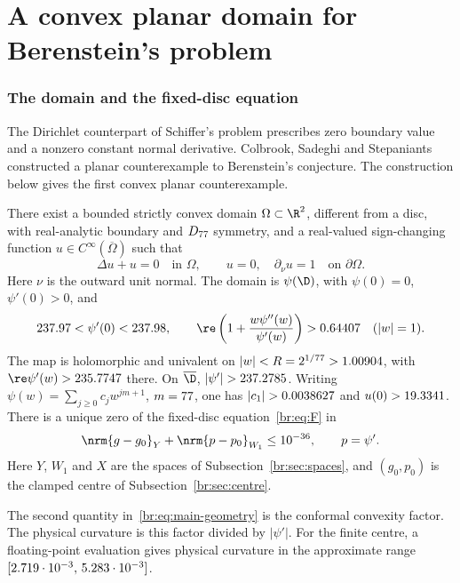 \part{A convex planar domain for Berenstein's problem}\label{br:part}
\section{The domain and the fixed-disc equation}\label{br:sec:formulation}

The Dirichlet counterpart of Schiffer's problem prescribes zero boundary
value and a nonzero constant normal derivative. Colbrook, Sadeghi and
Stepaniants~\cite{CSS26} constructed a planar counterexample to
Berenstein's conjecture. The construction below gives the first convex
planar counterexample.

\begin{theorem}\label{br:thm:main}
There exist a bounded strictly convex domain $\Omega\subset\R^2$, different
from a disc, with real-analytic boundary and $D_{77}$ symmetry, and a
real-valued sign-changing function $u\in C^\infty(\overline\Omega)$ such that
\begin{equation}\label{br:eq:physical}
 \Delta u+u=0\quad\text{in }\Omega,\qquad
 u=0,\quad\partial_\nu u=1\quad\text{on }\partial\Omega.
\end{equation}
Here $\nu$ is the outward unit normal.
The domain is $\psi(\D)$, with $\psi(0)=0$, $\psi'(0)>0$, and
\begin{equation}\label{br:eq:main-geometry}
 \brRhoLo<\psi'(0)<\brRhoHi,\qquad
 \re\left(1+\frac{w\psi''(w)}{\psi'(w)}\right)>\brConvexLo
 \quad(|w|=1).
\end{equation}
The map is holomorphic and univalent on $|w|<R=2^{1/77}>1.00904$,
with $\re\psi'(w)>\brUnivalentLo$ there. On $\overline\D$,
$|\psi'|>\brDerivativeLo$. Writing
$\psi(w)=\sum_{j\ge0}c_jw^{jm+1}$, $m=77$, one has
$|c_1|>\brNonDiscLo$ and $u(0)>19.3341$.
There is a unique zero of the fixed-disc equation~\eqref{br:eq:F} in
\begin{equation}\label{br:eq:solution-ball}
 \nrm{g-g_0}_Y+\nrm{p-p_0}_{W_1}\le\brRadius,
 \qquad p=\psi'.
\end{equation}
Here $Y$, $W_1$ and $X$ are the spaces of
Subsection~\ref{br:sec:spaces}, and $(g_0,p_0)$ is the clamped centre of
Subsection~\ref{br:sec:centre}.
\end{theorem}

The second quantity in~\eqref{br:eq:main-geometry} is the conformal convexity
factor. The physical curvature is this factor divided by $|\psi'|$.
For the finite centre, a floating-point evaluation gives physical curvature
in the approximate range $[2.719\cdot10^{-3},\,5.283\cdot10^{-3}]$.

